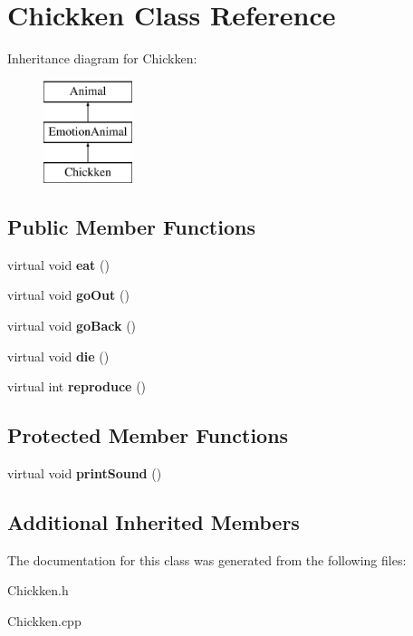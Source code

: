 \hypertarget{class_chickken}{}\section{Chickken Class Reference}
\label{class_chickken}
Inheritance diagram for Chickken\+:\begin{figure}[H]
\begin{center}
\leavevmode
\includegraphics[height=3.000000cm]{class_chickken}
\end{center}
\end{figure}
\subsection*{Public Member Functions}
\begin{DoxyCompactItemize}
\item 
\mbox{\label{class_chickken_a5afa4e5b0d89b1784f548cf9425cc9dc}} 
virtual void {\bfseries eat} ()
\item 
\mbox{\label{class_chickken_aa5d91cc9bc212f83e6487bb36c666648}} 
virtual void {\bfseries go\+Out} ()
\item 
\mbox{\label{class_chickken_a079bd1ac8b072dc394b93e0b7bb9cd7f}} 
virtual void {\bfseries go\+Back} ()
\item 
\mbox{\label{class_chickken_a17fb5fca5c9892213b4643ae1f52edfa}} 
virtual void {\bfseries die} ()
\item 
\mbox{\label{class_chickken_a8f913a17c4eb144df358c6edd1a1a1df}} 
virtual int {\bfseries reproduce} ()
\end{DoxyCompactItemize}
\subsection*{Protected Member Functions}
\begin{DoxyCompactItemize}
\item 
\mbox{\label{class_chickken_a699f5adc92f7afa8f411350d44971a1d}} 
virtual void {\bfseries print\+Sound} ()
\end{DoxyCompactItemize}
\subsection*{Additional Inherited Members}


The documentation for this class was generated from the following files\+:\begin{DoxyCompactItemize}
\item 
Chickken.\+h\item 
Chickken.\+cpp\end{DoxyCompactItemize}

